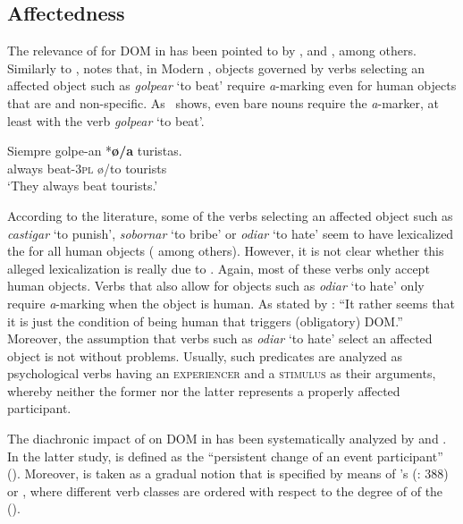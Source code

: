 \documentclass[output=paper]{LSP/langsci}
\begin{document}
\subsection{Affectedness}\label{08-ga-sec:4.2}
\largerpage
The relevance of  for DOM in  has been pointed to by \citet{Spitzer1928Rum}, \citet{Pottier1968Emploi} and \citet{Torrego1999Gramatica}, among others. Similarly to , \citet[1791]{Torrego1999Gramatica} notes that, in Modern , objects governed by verbs selecting an affected object such as \textit{golpear} ‘to beat’ require \textit{a}-marking even for human objects that are  and non-specific. As~ shows, even bare nouns require the \textit{a}-marker, at least with the verb \textit{golpear} ‘to beat’.

\ea \label{08-ga-ex:16}
\gll Siempre golpe-an *\textbf{ø/a} turistas.\\
always beat-\textsc{3pl} ø/to tourists\\
\glt ‘They always beat tourists.’
\z

According to the literature, some of the verbs selecting an affected object such as \textit{castigar} ‘to punish’, \textit{sobornar} ‘to bribe’ or \textit{odiar} ‘to hate’ seem to have lexicalized the  for all human objects (\cf \citealt[84]{Leonetti2004Specificity} among others). However, it is not clear whether this alleged lexicalization is really due to . Again, most of these verbs only accept human objects. Verbs that also allow for  objects such as \textit{odiar} ‘to hate’ only require \textit{a}-marking when the object is human. As stated by \citet[9]{vonHeusinger2008Verbal}: “It rather seems that it is just the condition of being human that triggers (obligatory) DOM.” Moreover, the assumption that verbs such as \textit{odiar} ‘to hate’ select an affected object is not without problems. Usually, such predicates are analyzed as psychological verbs having an \textsc{experiencer} and a \textsc{stimulus} as their arguments, whereby neither the former nor the latter represents a properly affected participant.

The diachronic impact of  on DOM in  has been systematically analyzed by \citet{vonHeusinger2008Verbal} and \citet{vonHeusingeretal2011Affectedness}. In the latter study,  is defined as the “persistent change of an event participant” (\citealt[593]{vonHeusingeretal2011Affectedness}). Moreover,  is taken as a gradual notion that is specified by means of \citeauthor{Tsunoda1985Remarks}’s (\citeyear{Tsunoda1985Remarks}: 388)  or , where different verb classes are ordered with respect to the degree of  of the  (\cf {}). 
\end{document}
